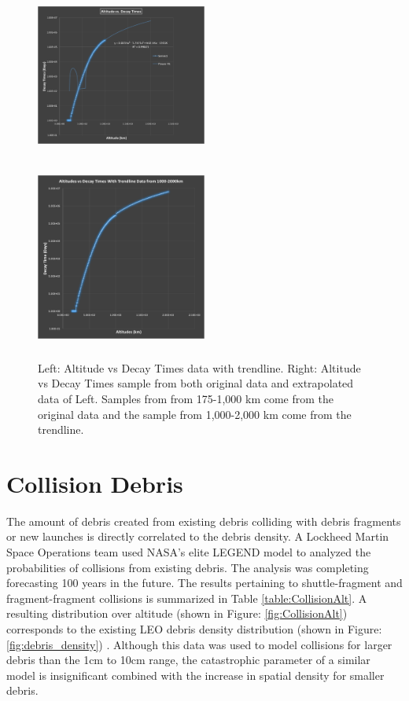 \documentclass[pre,12pt]{revtex4-1}
\begin{document}
\begin{figure}[h]
\centerline{%
\includegraphics[height=6cm, width=0.5\textwidth]{"Figures/extrapolatedAltDecayTimes"}%
\includegraphics[height=6cm, width=0.5\textwidth]{"Figures/altDecayTimesWithAddedData"}%
}%
\caption{Left: Altitude vs Decay Times data with trendline. Right: Altitude vs Decay Times sample from both original data and extrapolated data of Left. Samples from from 175-1,000 km come from the original data and the sample from 1,000-2,000 km come from the trendline.}
\label{fig:altDecayTimesExtrapolated}
\end{figure}


\clearpage
\section{Collision Debris}\label{AppendixC}
The amount of debris created from existing debris colliding with debris fragments or new launches is directly correlated to the debris density. A Lockheed Martin Space Operations team used NASA's elite LEGEND model to analyzed the probabilities of collisions from existing debris. The analysis was completing forecasting 100 years in the future. The results pertaining to shuttle-fragment and fragment-fragment collisions is summarized in Table \ref{table:CollisionAlt}. A resulting distribution over altitude (shown in Figure: \ref{fig:CollisionAlt}) corresponds to the existing LEO debris density distribution (shown in Figure: \ref{fig:debris_density}) \citep{CollisionProbs}. Although this data was used to model collisions for larger debris than the 1cm to 10cm range, the catastrophic parameter of a similar model \cite{CollisionProbs2} is insignificant combined with the increase in spatial density for smaller debris.
\end{document}
